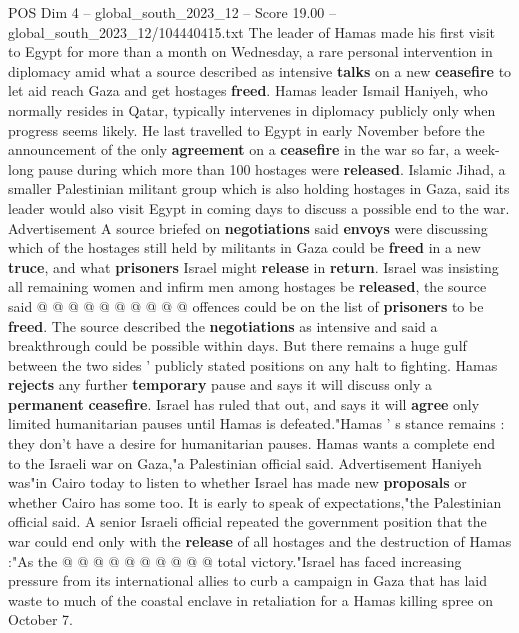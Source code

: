 \begin{textsample}{POS Dim 4 – global\_south\_2023\_12 – Score 19.00 – global\_south\_2023\_12/104440415.txt}  \label{ex:f4_pos_144}
The leader of Hamas made his first visit to Egypt for more than a month on Wednesday, a rare personal intervention in diplomacy amid what a source described as intensive \textbf{talks} on a new \textbf{ceasefire} to let aid reach Gaza and get hostages \textbf{freed}.
Hamas leader Ismail Haniyeh, who normally resides in Qatar, typically intervenes in diplomacy publicly only when progress seems likely.
He last travelled to Egypt in early November before the announcement of the only \textbf{agreement} on a \textbf{ceasefire} in the war so far, a week-long pause during which more than 100 hostages were \textbf{released}.
Islamic Jihad, a smaller Palestinian militant group which is also holding hostages in Gaza, said its leader would also visit Egypt in coming days to discuss a possible end to the war.
Advertisement A source briefed on \textbf{negotiations} said \textbf{envoys} were discussing which of the hostages still held by militants in Gaza could be \textbf{freed} in a new \textbf{truce}, and what \textbf{prisoners} Israel might \textbf{release} in \textbf{return}.
Israel was insisting all remaining women and infirm men among hostages be \textbf{released}, the source said @ @ @ @ @ @ @ @ @ @ offences could be on the list of \textbf{prisoners} to be \textbf{freed}.
The source described the \textbf{negotiations} as intensive and said a breakthrough could be possible within days.
But there remains a huge gulf between the two sides ' publicly stated positions on any halt to fighting.
Hamas \textbf{rejects} any further \textbf{temporary} pause and says it will discuss only a \textbf{permanent} \textbf{ceasefire}.
Israel has ruled that out, and says it will \textbf{agree} only limited humanitarian pauses until Hamas is defeated."Hamas ' s stance remains : they don't have a desire for humanitarian pauses.
Hamas wants a complete end to the Israeli war on Gaza,"a Palestinian official said.
Advertisement Haniyeh was"in Cairo today to listen to whether Israel has made new \textbf{proposals} or whether Cairo has some too.
It is early to speak of expectations,"the Palestinian official said.
A senior Israeli official repeated the government position that the war could end only with the \textbf{release} of all hostages and the destruction of Hamas :"As the @ @ @ @ @ @ @ @ @ @ total victory."Israel has faced increasing pressure from its international allies to curb a campaign in Gaza that has laid waste to much of the coastal enclave in retaliation for a Hamas killing spree on October 7.

\end{textsample}
